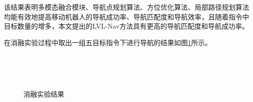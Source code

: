 该结果表明多模态融合模块、导航点规划算法、方位优化算法、局部路径规划算法均能有效地提高移动机器人的导航成功率、导航匹配度和导航效率，且随着指令中目标数量的增多，本文提出的LVL-Nav方法具有更高的导航匹配度和导航成功率。


在消融实验过程中取出一组五目标指令下进行导航的结果如图\ref{Ablationfig}所示。
\begin{figure}[htbp]
    \centering
    \\
    \\
    \\
    \caption{消融实验结果}
    \label{Ablationfig}
\end{figure}
